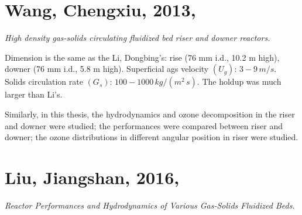 %
%
\section[Wang, Chengxiu, 2013]{Wang, Chengxiu, 2013, \cite{wangcx2013}}
\textit{High density gas-solids circulating fluidized bed riser and downer reactors.}

Dimension is the same as the Li, Dongbing's: rise (76 mm i.d., 10.2 m high), downer (76 mm i.d., 5.8 m high). 
Superficial ags velocity $(U_g)$: $3-9\,\si{m/s}$. 
Solids circulation rate $(G_s)$: $100-1000\,\si{kg/(m^2\,s)}$. 
The holdup was much larger than Li's.

Similarly, in this thesis, the hydrodynamics and ozone decomposition in the riser and downer were studied;
the performances were compared between riser and downer; 
the ozone distributions in different angular position in riser were studied.

%
%
\section[Liu, Jiangshan, 2016]{Liu, Jiangshan, 2016, \cite{liujs2016}}
\textit{Reactor Performances and Hydrodynamics of Various Gas-Solids Fluidized Beds.}